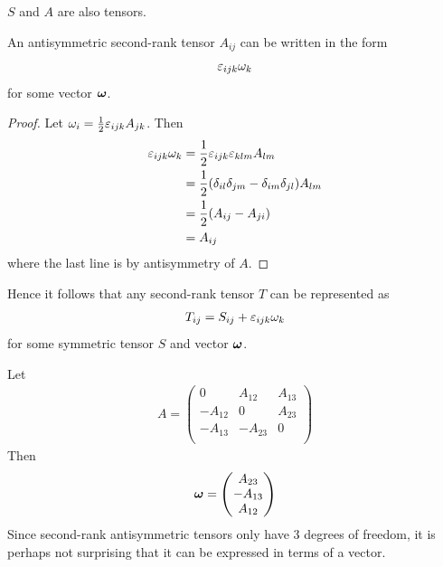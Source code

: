 \documentclass{../template/note}
\begin{document}
    \begin{remark*}
        \(S\) and \(A\) are also tensors.
    \end{remark*}
    
    \begin{proposition*}
        An antisymmetric second-rank tensor \(A_{ij}\) can be written in the form
        \begin{align*}
            \varepsilon_{ijk}\omega_k
        \end{align*}
        for some vector \(\V \omega\).        
    \end{proposition*}
    
    \begin{proof}
        Let \(\omega_i = \frac 1 2 \varepsilon_{ijk}A_{jk}\). Then
        \begin{align*}
            \varepsilon_{ijk}\omega_k &= \frac 1 2 \varepsilon_{ijk}\varepsilon_{klm}A_{lm} \\
            &= \frac 1 2 (\delta_{il}\delta_{jm}-\delta_{im}\delta_{jl})A_{lm} \\
            &= \frac 1 2 (A_{ij}-A_{ji}) \\
            &= A_{ij}
        \end{align*}
        where the last line is by antisymmetry of \(A\).        
    \end{proof}
    
    Hence it follows that any second-rank tensor \(T\) can be represented as
    \begin{align*}
        T_{ij} = S_{ij}+\varepsilon_{ijk}\omega_k
    \end{align*}
    for some symmetric tensor \(S\) and vector \(\V \omega\).
    
    \begin{remark*}
        Let
        \begin{align*}
            A = \begin{pmatrix}
                0 & A_{12} & A_{13} \\
                -A_{12} & 0 & A_{23} \\
                -A_{13} & -A_{23} & 0 \\
            \end{pmatrix}
        \end{align*}
        Then
        \begin{align*}
            \V \omega = \begin{pmatrix}
                A_{23} \\
                -A_{13} \\
                A_{12} \\
            \end{pmatrix}
        \end{align*}
        Since second-rank antisymmetric tensors only have 3 degrees of freedom, it is perhaps not surprising that it can be expressed in terms of a vector.       
    \end{remark*}
\end{document}
